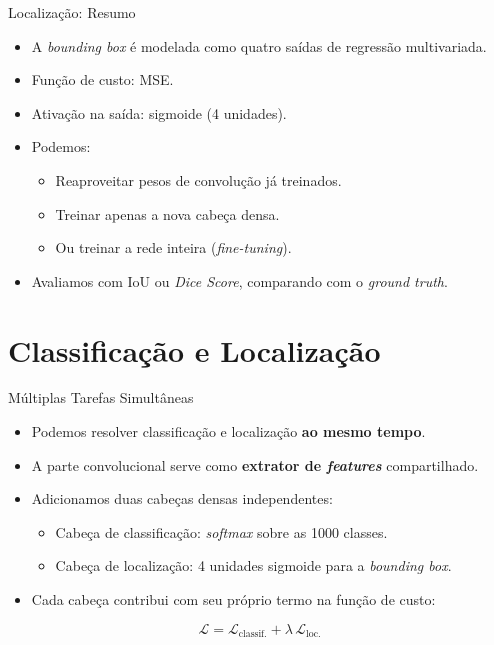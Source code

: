 \documentclass[aspectratio=169,xcolor=dvipsnames]{beamer}
\begin{document}
\begin{frame}{Localização: Resumo}
\begin{itemize}
    \item A \textit{bounding box} é modelada como quatro saídas de regressão multivariada.
    \item Função de custo: MSE.
    \item Ativação na saída: sigmoide (4 unidades).
    \item Podemos:
    \begin{itemize}
        \item Reaproveitar pesos de convolução já treinados.
        \item Treinar apenas a nova cabeça densa.
        \item Ou treinar a rede inteira (\textit{fine-tuning}).
    \end{itemize}
    \item Avaliamos com IoU ou \textit{Dice Score}, comparando com o \textit{ground truth}.
\end{itemize}
\end{frame}

\section{Classificação e Localização}

\begin{frame}{Múltiplas Tarefas Simultâneas}
\begin{itemize}
    \item Podemos resolver classificação e localização \textbf{ao mesmo tempo}.
    \item A parte convolucional serve como \textbf{extrator de \textit{features}} compartilhado.
    \item Adicionamos duas cabeças densas independentes:
    \begin{itemize}
        \item Cabeça de classificação: \textit{softmax} sobre as 1000 classes.
        \item Cabeça de localização: 4 unidades sigmoide para a \textit{bounding box}.
    \end{itemize}
    \item Cada cabeça contribui com seu próprio termo na função de custo:
\end{itemize}
\begin{equation*}
\mathcal{L} = \mathcal{L}_{\text{classif.}} + \lambda\,\mathcal{L}_{\text{loc.}}
\end{equation*}
\end{frame}
\end{document}
